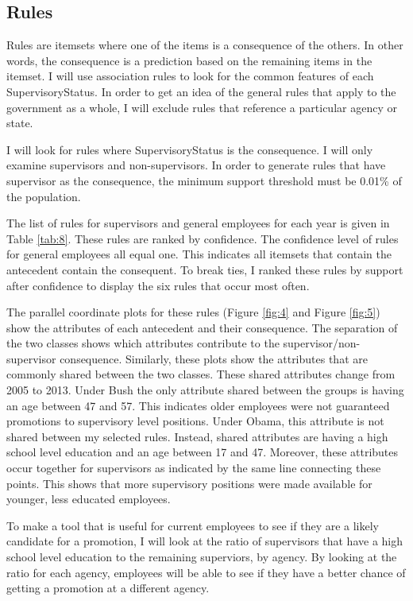 \documentclass{article}
\begin{document}
    \subsection{Rules}
    Rules are itemsets where one of the items is a consequence of the others. In other words, the consequence is a prediction based on the remaining items in the itemset. I will use association rules to look for the common features of each SupervisoryStatus. In order to get an idea of the general rules that apply to the government as a whole, I will exclude rules that reference a particular agency or state.
    \par
    I will look for rules where SupervisoryStatus is the consequence. I will only examine supervisors and non-supervisors. In order to generate rules that have supervisor as the consequence, the minimum support threshold must be 0.01\% of the population.
    \par
    The list of rules for supervisors and general employees for each year is given in Table \ref{tab:8}. These rules are ranked by confidence. The confidence level of rules for general employees all equal one. This indicates all itemsets that contain the antecedent contain the consequent. To break ties, I ranked these rules by support after confidence to display the six rules that occur most often.
    \par
    The parallel coordinate plots for these rules (Figure \ref{fig:4} and Figure \ref{fig:5}) show the attributes of each antecedent and their consequence. The separation of the two classes shows which attributes contribute to the supervisor/non-supervisor consequence. Similarly, these plots show the attributes that are commonly shared between the two classes. These shared attributes change from 2005 to 2013. Under Bush the only attribute shared between the groups is having an age between 47 and 57. This indicates older employees were not guaranteed promotions to supervisory level positions. Under Obama, this attribute is not shared between my selected rules. Instead, shared attributes are having a high school level education and an age between 17 and 47. Moreover, these attributes occur together for supervisors as indicated by the same line connecting these points. This shows that more supervisory positions were made available for younger, less educated employees.
    \par
    To make a tool that is useful for current employees to see if they are a likely candidate for a promotion, I will look at the ratio of supervisors that have a high school level education to the remaining superviors, by agency. By looking at the ratio for each agency, employees will be able to see if they have a better chance of getting a promotion at a different agency.
\end{document}
